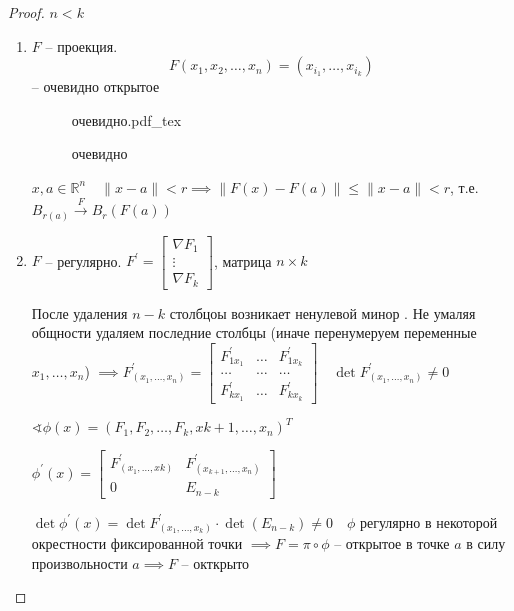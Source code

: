 \documentclass{book}
\newcommand\R{\ensuremath{\mathbb{R}}}
\newcommand{\p}[1]{#1^{\prime}}
\theoremstyle{definition}
\newcommand{\incfig}[1]{%
    \def\svgwidth{\columnwidth}
    {#1.pdf_tex}
}
\begin{document}
\begin{proof}
    $ n < k$

     \begin{enumerate}
         \item $F$ -- проекция.  \[F(x_1, x_2, \ldots, x_{n} ) = \left( x_{i_1}, \ldots, x_{i_k} \right) \] -- очевидно открытое

\begin{figure}[!ht]
    \centering
    \incfig{очевидно}
    \caption{очевидно}
    \label{fig:очевидно}
\end{figure}

$x, a\in \R^n\quad \|x-a\|<r \implies \|F(x) - F(a)\|\leqslant \|x-a\|<r$, т.е. $B_{r(a)} \overset F {\to } B_r\left(F(a)  \right) $ 
        \item  $F$ -- регулярно.  $\p F = \begin{bmatrix} \nabla F_1\\ \vdots\\ \nabla F_k \end{bmatrix} $, матрица $n\times k$

            После удаления $n-k$ столбцоы возникает ненулевой минор . Не умаляя общности удаляем последние столбцы (иначе перенумеруем переменные  $x_{1}, \ldots, x_{n} $) $\implies \p F_{\left( x_1, \ldots, x_{n}  \right) } = \begin{bmatrix} \p F_{1x_1} &\ldots & \p F_{1x_k}\\ \ldots & \ldots & \ldots\\ \p F_{kx_1} &\ldots & \p F_{kx_k} \end{bmatrix}\quad \det \p F_{\left( x_1, \ldots, x_{n}  \right) } \neq 0$

            $\sphericalangle \phi(x) = \left( F_1, F_2, \ldots, F_k, x{k+1}, \ldots, x_{n}  \right)^T $

            $\p \phi(x) = \begin{bmatrix} \p F_{\left( x_1, \ldots, xk \right) }& \p F_{\left( x_{k+1}, \ldots, x_{n}  \right) }\\ 0 & E_{n-k} \end{bmatrix} $ 

            $\det \p \phi(x) = \det \p F_{\left( x_1, \ldots, x_k \right) } \cdot  \det \left( E_{n-k} \right) \neq 0\quad \phi$ регулярно в некоторой окрестности фиксированной точки $\implies F = \pi\circ \phi$ -- открытое в точке $a$  в силу произвольности  $a \implies F$ -- окткрыто
    \end{enumerate}     
\end{proof}
\end{document}
